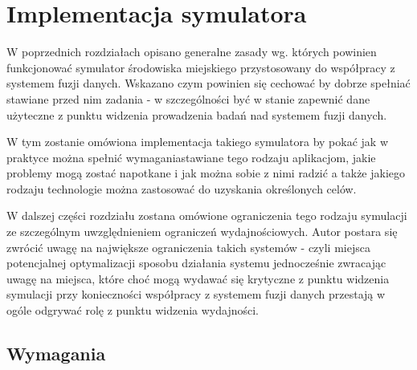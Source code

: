 \chapter{Implementacja symulatora}

\par{
W poprzednich rozdziałach opisano generalne zasady wg. których powinien funkcjonować symulator środowiska miejskiego przystosowany do współpracy z systemem fuzji danych. Wskazano czym powinien się cechować by dobrze spełniać stawiane przed nim zadania - w szczególności być w stanie zapewnić dane użyteczne z punktu widzenia prowadzenia badań nad systemem fuzji danych.
}
\par{
W tym zostanie omówiona implementacja takiego symulatora by pokać jak w praktyce można spełnić wymaganiastawiane tego rodzaju aplikacjom, jakie problemy mogą zostać napotkane i jak można sobie z nimi radzić a także jakiego rodzaju technologie można zastosować do uzyskania określonych celów.
}
\par{
W dalszej części rozdziału zostana omówione ograniczenia tego rodzaju symulacji ze szczególnym uwzględnieniem ograniczeń wydajnościowych. Autor postara się zwrócić uwagę na największe ograniczenia takich systemów - czyli miejsca potencjalnej optymalizacji sposobu działania systemu jednocześnie zwracając uwagę na miejsca, które choć mogą wydawać się krytyczne z punktu widzenia symulacji przy konieczności współpracy z systemem fuzji danych przestają w ogóle odgrywać rolę z punktu widzenia wydajności.
}

\section[Wymagania][Wymagania]{Wymagania}

